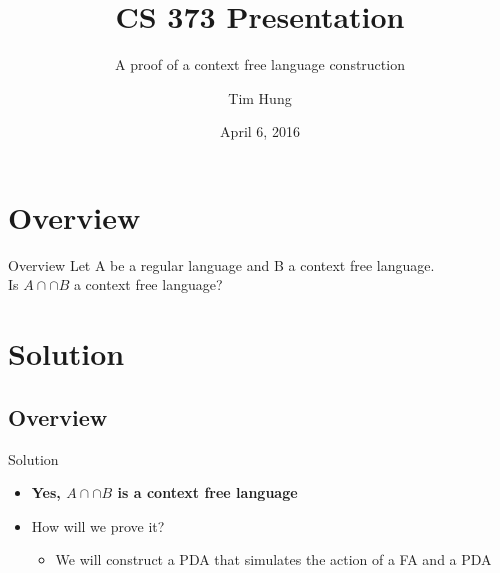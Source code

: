 \documentclass{beamer}
\title{CS 373 Presentation}
\subtitle{A proof of a context free language construction}
\author{Tim Hung}
\institute{Binghamton University}
\date{April 6, 2016}
\begin{document}
\frame{\titlepage}
\section{Overview}\frame{\sectionpage}
\begin{frame}{Overview}
  Let A be a regular language and B a context free language. \\
  Is $A\cap∩ B$ a context free language?
\end{frame}

\section{Solution}\frame{\sectionpage}
\subsection{Overview}
\begin{frame}{Solution}
    \begin{itemize}
        \item \textbf{Yes, $A\cap∩ B$ is a context free language}
        \item How will we prove it?
        \begin{itemize}
            \item We will construct a PDA that simulates the action of a FA and a PDA
        \end{itemize}
    \end{itemize}
\end{frame}
\end{document}
